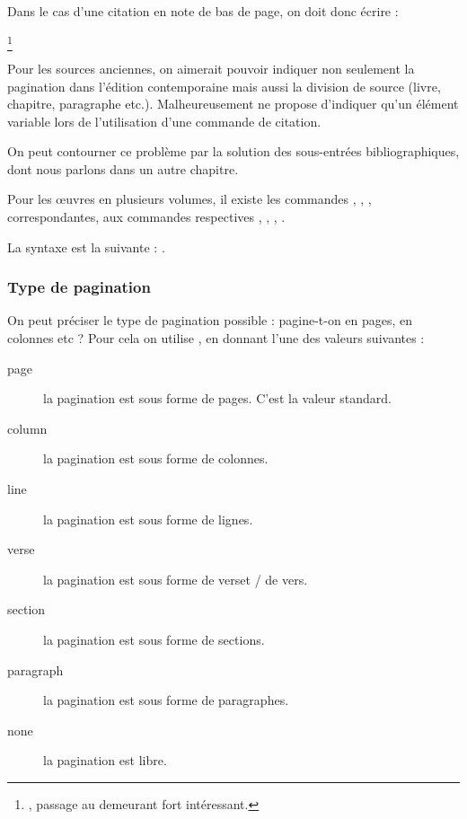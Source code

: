 Dans le cas d'une citation en note de bas de page, on doit donc écrire :

\begin{latexcode}
\footnote{\cite[24]{Junod1992}, passage au demeurant fort intéressant.}
\end{latexcode}

\begin{attention}
Pour les sources anciennes, on aimerait pouvoir indiquer non seulement la pagination dans l'édition contemporaine mais aussi la division de source (livre, chapitre, paragraphe etc.). Malheureusement  ne propose d'indiquer qu'un élément variable lors de l'utilisation d'une commande de citation.

On peut contourner ce problème par la solution des sous-entrées bibliographiques, dont nous parlons dans un autre chapitre. 
\end{attention}

\begin{plusloins}
Pour les œuvres en plusieurs volumes, il existe les commandes , , ,  correspondantes, aux commandes respectives , , , .

La syntaxe est la suivante : .
\end{plusloins}

\subsubsection{Type de pagination}

On peut préciser le type de pagination possible : pagine-t-on en pages, en colonnes etc ? Pour cela on utilise  , en donnant l'une des valeurs suivantes : 

\begin{description}
\item[page] la pagination est sous forme de pages. C'est la valeur standard.
\item[column] la pagination est sous forme de colonnes.
\item[line] la pagination est sous forme de lignes.
\item[verse] la pagination est sous forme de verset / de vers. 
\item[section] la pagination est sous forme de sections.
\item[paragraph] la pagination est sous forme de paragraphes.
\item[none] la pagination est libre.
\end{description}


